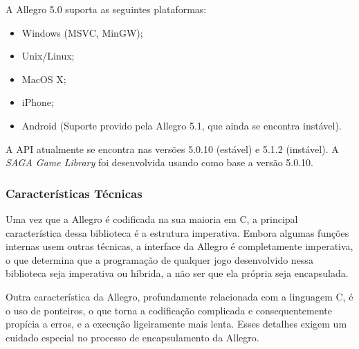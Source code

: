 \par
A Allegro 5.0 suporta as seguintes plataformas:
%
\begin{itemize}
 \item Windows (MSVC, MinGW);
 \item Unix/Linux;
 \item MacOS X;
 \item iPhone;
 \item Android (Suporte provido pela Allegro 5.1, que ainda se encontra instável).
\end{itemize}
%
A API atualmente se encontra nas versões 5.0.10 (estável) e 5.1.2 (instável). A \textit{SAGA Game Library} foi desenvolvida usando como base a versão 5.0.10.
\subsubsection{Características Técnicas}
%
Uma vez que a Allegro é codificada na sua maioria em C, a principal característica dessa biblioteca é a estrutura imperativa. Embora algumas funções internas usem outras técnicas, a interface da Allegro é completamente imperativa, o que determina que a programação de qualquer jogo desenvolvido nessa biblioteca seja imperativa ou híbrida, a não ser que ela própria seja encapsulada.
\par
Outra característica da Allegro, profundamente relacionada com a linguagem C, é o uso de ponteiros, o que torna a codificação complicada e consequentemente propícia a erros, e a execução ligeiramente mais lenta. Esses detalhes exigem um cuidado especial no processo de encapsulamento da Allegro.
%

